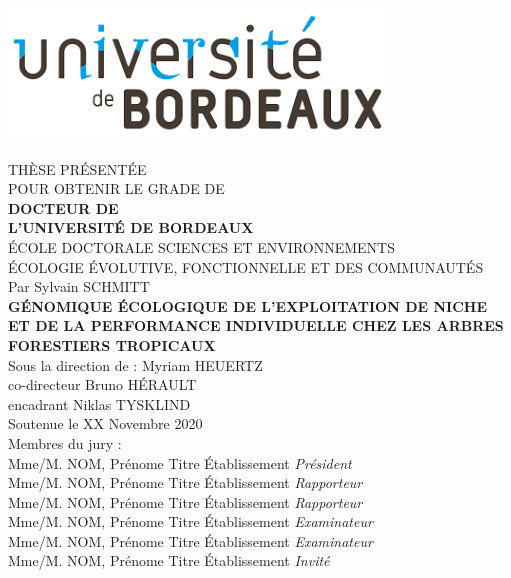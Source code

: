 \includegraphics[width=0.3\columnwidth]{images/UB.png}

\begin{center}
  \normalsize{THÈSE PRÉSENTÉE} \\
  \normalsize{POUR OBTENIR LE GRADE DE} \\
  \vspace*{\fill}
  \Large{\textbf{DOCTEUR DE}} \\
  \Large{\textbf{L'UNIVERSITÉ DE BORDEAUX}} \\
  \vspace*{\fill}
  \normalsize{ÉCOLE DOCTORALE SCIENCES ET ENVIRONNEMENTS} \\
  \normalsize{ÉCOLOGIE ÉVOLUTIVE, FONCTIONNELLE ET DES COMMUNAUTÉS} \\
  \vspace*{\fill}
  \normalsize{Par Sylvain SCHMITT} \\
  \vspace*{\fill}
  \Large{\textbf{GÉNOMIQUE ÉCOLOGIQUE DE L'EXPLOITATION DE NICHE ET DE LA PERFORMANCE INDIVIDUELLE CHEZ LES ARBRES FORESTIERS TROPICAUX}} \\
  \vspace*{\fill}
  \normalsize{Sous la direction de : Myriam HEUERTZ} \\
  \normalsize{co-directeur Bruno HÉRAULT} \\
  \normalsize{encadrant Niklas TYSKLIND} \\
  \vspace*{\fill}
  \normalsize{Soutenue le XX Novembre 2020} \\
  \vspace*{\fill}
  \normalsize{Membres du jury :} \\
  \vspace*{\fill}
  Mme/M. NOM, Prénome Titre Établissement  \emph{Président} \\
  Mme/M. NOM, Prénome Titre Établissement  \emph{Rapporteur} \\
  Mme/M. NOM, Prénome Titre Établissement  \emph{Rapporteur} \\
  Mme/M. NOM, Prénome Titre Établissement  \emph{Examinateur} \\
  Mme/M. NOM, Prénome Titre Établissement  \emph{Examinateur} \\
  Mme/M. NOM, Prénome Titre Établissement  \emph{Invité} \\
\end{center}